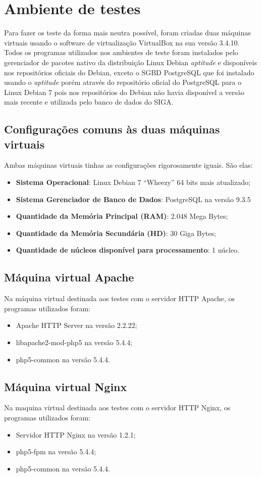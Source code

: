 \section{Ambiente de testes}

Para fazer os teste da forma mais neutra possível, foram criadas duas máquinas virtuais usando o software de virtualização VirtualBox na sua versão 3.4.10.\\
Todos os programas utilizados nos ambientes de teste foram instalados pelo gerenciador de pacotes nativo da distribuição Linux Debian \textit{aptitude} e disponíveis nos repositórios oficiais do Debian, exceto o SGBD PostgreSQL que foi instalado usando o \textit{aptitude} porém através do repositório oficial do PostgreSQL para o Linux Debian 7 pois nos repositórios do Debian não havia disponível a versão mais recente e utilizada pelo banco de dados do SIGA.

\subsection{Configurações comuns às duas máquinas virtuais}
 Ambas máquinas virtuais tinhas as configurações rigorosamente iguais. São elas:
\begin{itemize}
\item \textbf{Sistema Operacional}: Linux Debian 7 “Wheezy” 64 bits mais atualizado;
\item \textbf{Sistema Gerenciador de Banco de Dados}: PostgreSQL na versão 9.3.5
\item \textbf{Quantidade da Memória Principal (RAM)}: 2.048 Mega Bytes;
\item \textbf{Quantidade da Memória Secundária (HD)}: 30 Giga Bytes;
\item \textbf{Quantidade de núcleos disponível para processamento}: 1 núcleo.
\end{itemize}

\subsection{Máquina virtual Apache}
Na máquina virtual destinada aos testes com o servidor HTTP Apache, os programas utilizados foram:
\begin{itemize}
\item Apache HTTP Server na versão 2.2.22;
\item libapache2-mod-php5 na versão 5.4.4;
\item php5-common na versão 5.4.4.
\end{itemize}

\subsection{Máquina virtual Nginx}
Na maquina virtual destinada aos testes com o servidor HTTP Nginx, os programas utilizados foram:

\begin{itemize}
\item Servidor HTTP Nginx na versão 1.2.1;
\item php5-fpm na versão 5.4.4;
\item php5-common na versão 5.4.4.
\end{itemize}

